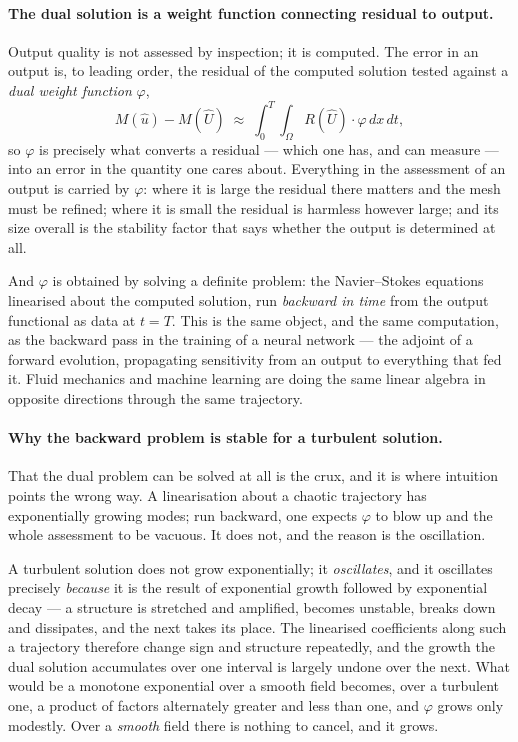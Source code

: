 \documentclass[11pt]{article}
\begin{document}
\paragraph{The dual solution is a weight function connecting residual to output.} Output quality is
not assessed by inspection; it is computed. The error in an output is, to leading order, the residual
of the computed solution tested against a \emph{dual weight function} $\varphi$,
\begin{equation}\label{eq:dualrep}
M(\hat u) - M(\hat U) \;\approx\; \int_0^T\!\!\int_\Omega R(\hat U)\cdot\varphi \,dx\,dt ,
\end{equation}
so $\varphi$ is precisely what converts a residual --- which one has, and can measure --- into an
error in the quantity one cares about. Everything in the assessment of an output is carried by
$\varphi$: where it is large the residual there matters and the mesh must be refined; where it is
small the residual is harmless however large; and its size overall is the stability factor that says
whether the output is determined at all.

And $\varphi$ is obtained by solving a definite problem: the Navier--Stokes equations linearised about
the computed solution, run \emph{backward in time} from the output functional as data at $t=T$. This
is the same object, and the same computation, as the backward pass in the training of a neural network
--- the adjoint of a forward evolution, propagating sensitivity from an output to everything that fed
it. Fluid mechanics and machine learning are doing the same linear algebra in opposite directions
through the same trajectory.

\paragraph{Why the backward problem is stable for a turbulent solution.} That the dual problem can be
solved at all is the crux, and it is where intuition points the wrong way. A linearisation about a
chaotic trajectory has exponentially growing modes; run backward, one expects $\varphi$ to blow up and
the whole assessment to be vacuous. It does not, and the reason is the oscillation.

A turbulent solution does not grow exponentially; it \emph{oscillates}, and it oscillates precisely
\emph{because} it is the result of exponential growth followed by exponential decay --- a structure is
stretched and amplified, becomes unstable, breaks down and dissipates, and the next takes its place.
The linearised coefficients along such a trajectory therefore change sign and structure repeatedly,
and the growth the dual solution accumulates over one interval is largely undone over the next. What
would be a monotone exponential over a smooth field becomes, over a turbulent one, a product of
factors alternately greater and less than one, and $\varphi$ grows only modestly. Over a
\emph{smooth} field there is nothing to cancel, and it grows.
\end{document}
